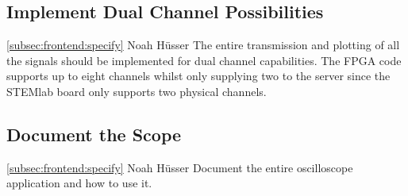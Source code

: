 \documentclass[a4paper,oneside]{alpenspecs/alpenspecs}
\begin{document}
\subsection{Implement Dual Channel Possibilities}
\label{subsec:frontend:}
\wpac
    {}
    {}
    {}
    {\ref{subsec:frontend:specify}}
    {}
    {Noah Hüsser}
    {%
        The  entire transmission  and plotting  of all  the signals  should be
        implemented for dual channel capabilities.
        The FPGA code supports up to  eight channels whilst only supplying two
        to  the server  since the  STEMlab  board only  supports two  physical
        channels.
    }

\subsection{Document the Scope}
\label{subsec:frontend:}
\wpac
    {}
    {}
    {}
    {\ref{subsec:frontend:specify}}
    {}
    {Noah Hüsser}
    {%
        Document the entire oscilloscope application and how to use it.
    }


\backmatter
\end{document}
